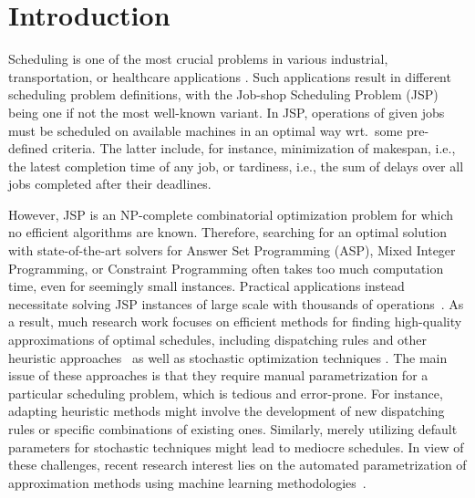 \documentclass[runningheads]{llncs}
\begin{document}
\section{Introduction}
Scheduling is one of the most crucial problems in various industrial, transportation, or healthcare applications
 \cite{pezzella2008genetic,chaudhry2016research,nouiri2018effective,demirbilek2019dynamically,schoenfelder2020nurse,wang2019routing,janakbhai2021blockchain}. 
%
Such applications result in different scheduling problem definitions, with the Job-shop Scheduling Problem (JSP) \cite{taillard1993benchmarks} being one if not the most well-known variant.
In JSP, operations of given jobs must be scheduled on available machines in an optimal way wrt.\ some pre-defined criteria. The latter include, for instance, minimization of makespan, i.e., the latest completion time of any job, or tardiness, i.e., the sum of delays over all jobs completed after their deadlines. 

However, JSP is an NP-complete combinatorial optimization problem \cite{DBLP:journals/mor/GareyJS76,SOTSKOV1995237} for which no efficient algorithms are known. Therefore, searching for an optimal solution with state-of-the-art solvers for Answer Set Programming (ASP), Mixed Integer Programming, or Constraint Programming \cite{meng2020mixed,coltep19a,el2020job,al2017job}
often takes too much computation time, even for seemingly small instances. Practical applications instead necessitate solving JSP instances of large scale with thousands of operations~\cite{zhang2010hybrid}.
As a result, much research work focuses on %
efficient methods for finding high-quality approximations of optimal schedules, including dispatching rules and other heuristic approaches~\cite{blackstone1982state} as well as stochastic optimization techniques \cite{DBLP:journals/informs/VaessensAL96,DBLP:journals/jim/CalisB15}.  
The main issue of these approaches is that they require manual parametrization for a particular scheduling problem, which is tedious and error-prone. For instance, adapting heuristic methods might involve the development of new dispatching rules or specific combinations of existing ones. Similarly, merely utilizing default parameters for stochastic techniques might lead to mediocre schedules.    
In view of these challenges, recent research interest lies on the automated parametrization of approximation methods using machine learning methodologies~\cite{bengio2020machine}.
\end{document}
